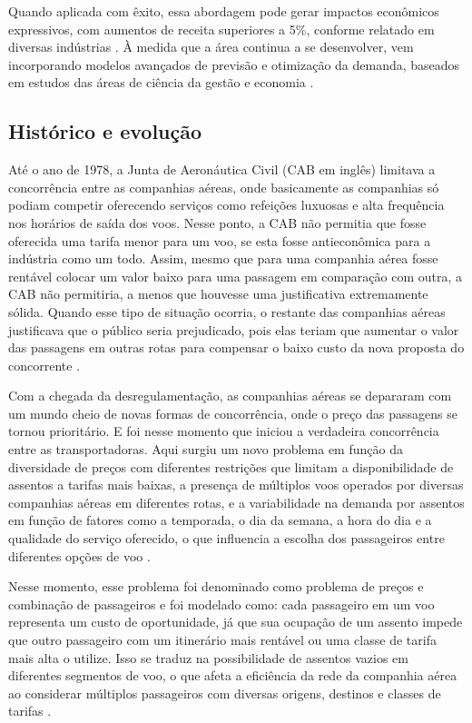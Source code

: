 Quando aplicada com êxito, essa abordagem pode gerar impactos econômicos expressivos, com aumentos de receita superiores a 5\%, conforme relatado em diversas indústrias \citep{Cross1995ANIT}. À medida que a área continua a se desenvolver, vem incorporando modelos avançados de previsão e otimização da demanda, baseados em estudos das áreas de ciência da gestão e economia \citep{Cheraghi2010RevenueMI}.

\subsection{Histórico e evolução}
Até o ano de 1978, a Junta de Aeronáutica Civil (CAB em inglês) limitava a concorrência entre as companhias aéreas, onde basicamente as companhias só podiam competir oferecendo serviços como refeições luxuosas e alta frequência nos horários de saída dos voos. Nesse ponto, a CAB não permitia que fosse oferecida uma tarifa menor para um voo, se esta fosse antieconômica para a indústria como um todo. Assim, mesmo que para uma companhia aérea fosse rentável colocar um valor baixo para uma passagem em comparação com outra, a CAB não permitiria, a menos que houvesse uma justificativa extremamente sólida. Quando esse tipo de situação ocorria, o restante das companhias aéreas justificava que o público seria prejudicado, pois elas teriam que aumentar o valor das passagens em outras rotas para compensar o baixo custo da nova proposta do concorrente \citep{article_base}.

Com a chegada da desregulamentação, as companhias aéreas se depararam com um mundo cheio de novas formas de concorrência, onde o preço das passagens se tornou prioritário. E foi nesse momento que iniciou a verdadeira concorrência entre as transportadoras. Aqui surgiu um novo problema em função da diversidade de preços com diferentes restrições que limitam a disponibilidade de assentos a tarifas mais baixas, a presença de múltiplos voos operados por diversas companhias aéreas em diferentes rotas, e a variabilidade na demanda por assentos em função de fatores como a temporada, o dia da semana, a hora do dia e a qualidade do serviço oferecido, o que influencia a escolha dos passageiros entre diferentes opções de voo \citep{article_base}.

Nesse momento, esse problema foi denominado como problema de preços e combinação de passageiros e foi modelado como: cada passageiro em um voo representa um custo de oportunidade, já que sua ocupação de um assento impede que outro passageiro com um itinerário mais rentável ou uma classe de tarifa mais alta o utilize. Isso se traduz na possibilidade de assentos vazios em diferentes segmentos de voo, o que afeta a eficiência da rede da companhia aérea ao considerar múltiplos passageiros com diversas origens, destinos e classes de tarifas \citep{article_base}.

